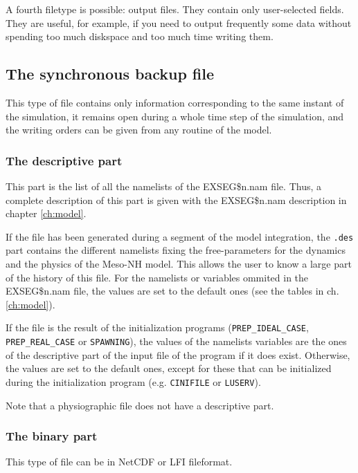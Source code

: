 A fourth filetype is possible: output files. They contain only user-selected fields.
They are useful, for example, if you need to output frequently some data without spending too much diskspace
and too much time writing them.


\subsection{The synchronous backup file} \label{ss:synchro}

This type of file contains only information corresponding to the same instant
of the simulation, it remains open during a whole time step of the simulation,
and the writing orders can be given from any routine of the model.

\subsubsection{The descriptive part}
This part is the list of all the namelists of the EXSEG\$n.nam file.
Thus, a complete description of this part is given
with the EXSEG\$n.nam description in chapter \ref{ch:model}.

If the file has been generated during a segment of the model integration, the 
{\tt .des} part contains the different
namelists fixing the free-parameters for the dynamics and the physics 
of the Meso-NH model. This allows the user to know a large
part of the history of this file. For the namelists or variables ommited 
in the EXSEG\$n.nam file, the values are set to the default ones
 (see the tables in ch.\ref{ch:model}).

If the file is the result of the initialization programs 
({\tt PREP\_IDEAL\_CASE}, {\tt PREP\_REAL\_CASE} or {\tt SPAWNING}),
 the values of the namelists variables are the ones of the descriptive part
of the input file of the program if it does exist. Otherwise, the values are
set to the default ones, except for these that can be initialized during the
initialization program (e.g. {\tt CINIFILE} or {\tt LUSERV}).

Note that a physiographic file does not have a descriptive part.

\subsubsection{The binary part}

This type of file can be in NetCDF or LFI fileformat.


